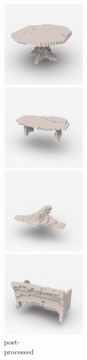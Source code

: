 \documentclass[14pt]{beamer}
\begin{document}
\begin{frame}
\begin{figure}
\begin{subfigure}[t]{0.18\textwidth}
        \includegraphics[scale=0.39]{qual_rgb_post}\\
        {\footnotesize post-\\[-4px]processed}
      \end{subfigure}
      \begin{subfigure}[t]{0.18\textwidth}
        \centering

\end{subfigure}
\end{figure}
\end{frame}
\end{document}
